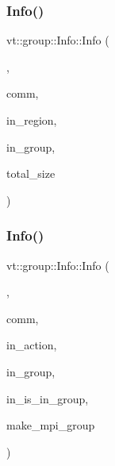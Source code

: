 \mbox{\label{structvt_1_1group_1_1_info_aadcf55179338b7921de5c1a6856a1d42}} 
\subsubsection{\texorpdfstring{Info()}{Info()}\hspace{0.1cm}{\footnotesize\ttfamily [3/4]}}
{\footnotesize\ttfamily vt\+::group\+::\+Info\+::\+Info (\begin{DoxyParamCaption}\item[{Info\+Rooted\+Remote\+Cons\+Type}]{,  }\item[{M\+P\+I\+\_\+\+Comm}]{comm,  }\item[{\hyperlink{structvt_1_1group_1_1_info_rooted_a127ac5ebcfb9871621c1f66dba481c0b}{Region\+Ptr\+Type}}]{in\+\_\+region,  }\item[{\hyperlink{namespacevt_a27b5e4411c9b6140c49100e050e2f743}{Group\+Type} const}]{in\+\_\+group,  }\item[{\hyperlink{structvt_1_1group_1_1region_1_1_region_a9bb381adf31111aae34dbc644bad6c1f}{Region\+Type\+::\+Size\+Type} const \&}]{total\+\_\+size }\end{DoxyParamCaption})}

\mbox{\label{structvt_1_1group_1_1_info_a76c4cf6ec9e88e8f79aa0fe90af82289}} 
\subsubsection{\texorpdfstring{Info()}{Info()}\hspace{0.1cm}{\footnotesize\ttfamily [4/4]}}
{\footnotesize\ttfamily vt\+::group\+::\+Info\+::\+Info (\begin{DoxyParamCaption}\item[{Info\+Collective\+Cons\+Type}]{,  }\item[{M\+P\+I\+\_\+\+Comm}]{comm,  }\item[{\hyperlink{namespacevt_ae0a5a7b18cc99d7b732cb4d44f46b0f3}{Action\+Type}}]{in\+\_\+action,  }\item[{\hyperlink{namespacevt_a27b5e4411c9b6140c49100e050e2f743}{Group\+Type} const}]{in\+\_\+group,  }\item[{bool const}]{in\+\_\+is\+\_\+in\+\_\+group,  }\item[{bool}]{make\+\_\+mpi\+\_\+group }\end{DoxyParamCaption})}

